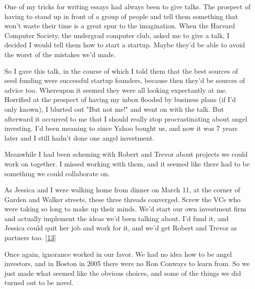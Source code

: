 One
                  of my tricks for writing essays had always been to give talks.
                  The prospect of having to stand up in front of a group of
                  people and tell them something that won't waste their time is
                  a great spur to the imagination. When the Harvard Computer
                  Society, the undergrad computer club, asked me to give a talk,
                  I decided I would tell them how to start a startup. Maybe
                  they'd be able to avoid the worst of the mistakes we'd
                  made.

So I gave this talk, in the course of which I
                  told them that the best sources of seed funding were
                  successful startup founders, because then they'd be sources of
                  advice too. Whereupon it seemed they were all looking
                  expectantly at me. Horrified at the prospect of having my
                  inbox flooded by business plans (if I'd only known), I blurted
                  out "But not me!" and went on with the talk. But afterward it
                  occurred to me that I should really stop procrastinating about
                  angel investing. I'd been meaning to since Yahoo bought us,
                  and now it was 7 years later and I still hadn't done one angel
                  investment.

Meanwhile I had been scheming with
                  Robert and Trevor about projects we could work on together. I
                  missed working with them, and it seemed like there had to be
                  something we could collaborate on.

As Jessica and I
                  were walking home from dinner on March 11, at the corner of
                  Garden and Walker streets, these three threads converged.
                  Screw the VCs who were taking so long to make up their minds.
                  We'd start our own investment firm and actually implement the
                  ideas we'd been talking about. I'd fund it, and Jessica could
                  quit her job and work for it, and we'd get Robert and Trevor
                  as partners too.
                  [\href{\#f13n}{13}]

Once again, ignorance worked in our favor. We had
                  no idea how to be angel investors, and in Boston in 2005 there
                  were no Ron Conways to learn from. So we just made what seemed
                  like the obvious choices, and some of the things we did turned
                  out to be novel.

